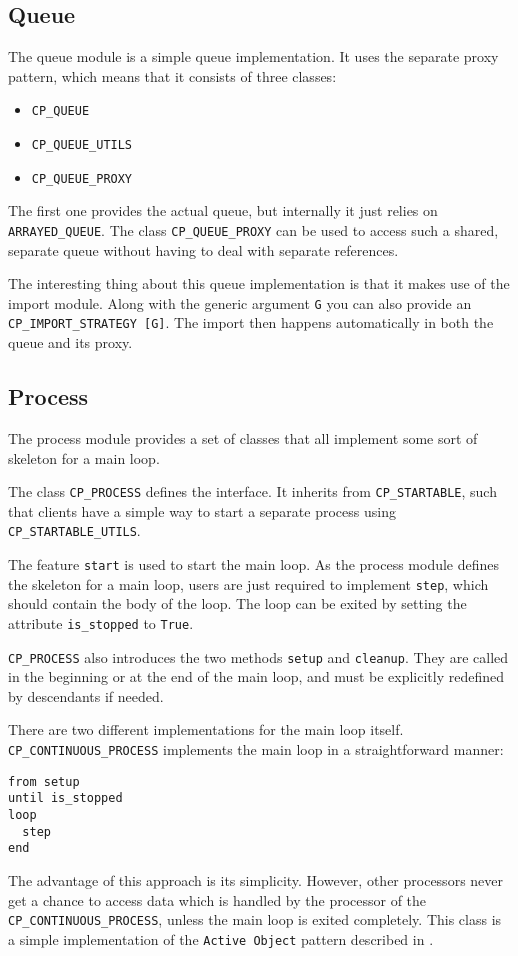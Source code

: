 \documentclass[a4paper,10pt]{report}
\begin{document}
\subsection{Queue}

The queue module is a simple queue implementation.
It uses the separate proxy pattern, which means that it consists of three classes:

\begin{itemize}
 \item \lstinline!CP_QUEUE!
 \item \lstinline!CP_QUEUE_UTILS!
 \item \lstinline!CP_QUEUE_PROXY!
\end{itemize}

The first one provides the actual queue, but internally it just relies on \lstinline!ARRAYED_QUEUE!.
The class \lstinline!CP_QUEUE_PROXY! can be used to access such a shared, separate queue without having to deal with separate references.

The interesting thing about this queue implementation is that it makes use of the import module.
Along with the generic argument \lstinline!G! you can also provide an \lstinline!CP_IMPORT_STRATEGY [G]!.
The import then happens automatically in both the queue and its proxy.

\subsection{Process}

The process module provides a set of classes that all implement some sort of skeleton for a main loop.

The class \lstinline!CP_PROCESS! defines the interface.
It inherits from \lstinline!CP_STARTABLE!, such that clients have a simple way to start a separate process using \lstinline!CP_STARTABLE_UTILS!.

The feature \lstinline!start! is used to start the main loop.
As the process module defines the skeleton for a main loop, users are just required to implement \lstinline!step!, which should contain the body of the loop.
The loop can be exited by setting the attribute \lstinline!is_stopped! to \lstinline!True!.

\lstinline!CP_PROCESS! also introduces the two methods \lstinline!setup! and \lstinline!cleanup!.
They are called in the beginning or at the end of the main loop, and must be explicitly redefined by descendants if needed.

There are two different implementations for the main loop itself.
\lstinline!CP_CONTINUOUS_PROCESS! implements the main loop in a straightforward manner:
\begin{lstlisting}
from setup
until is_stopped
loop
  step
end
\end{lstlisting}
The advantage of this approach is its simplicity.
However, other processors never get a chance to access data which is handled by the processor of the \lstinline!CP_CONTINUOUS_PROCESS!, unless the main loop is exited completely.
This class is a simple implementation of the \lstinline!Active Object! pattern described in .
\end{document}
